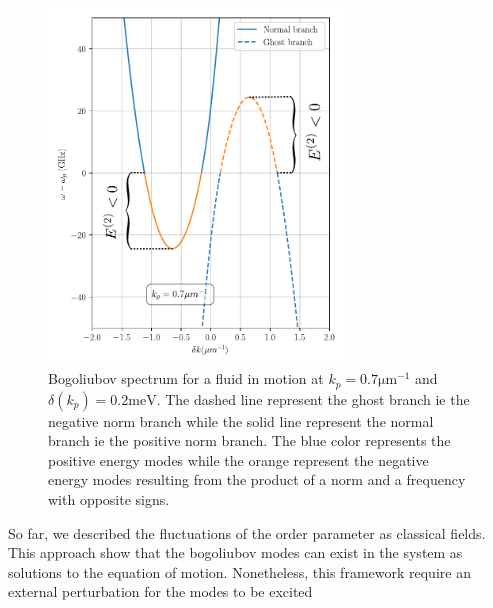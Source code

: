 \begin{figure}[h]
    \centering
    \includegraphics[width=0.7\textwidth]{chap_AG_theory/fig/bogo_gap_supersonic_dispersion.pdf}
    \caption{Bogoliubov spectrum for a fluid in motion at $k_p=0.7 \mathrm{\mu m^{-1}}$ and $\delta(k_p)=0.2 \mathrm{meV}$. The dashed line represent the ghost branch ie the negative norm branch while the solid line
    represent the normal branch ie the positive norm branch. The blue color represents the positive energy modes while the orange represent the negative energy modes resulting from the 
    product of a norm and a frequency with opposite signs.}
    \label{fig:gapped_supersonic}
\end{figure}


So far, we described the fluctuations of the order parameter as classical fields. This approach
show that the bogoliubov modes can exist in the system as solutions to the equation of motion. Nonetheless, this framework require 
an external perturbation for the modes to be excited